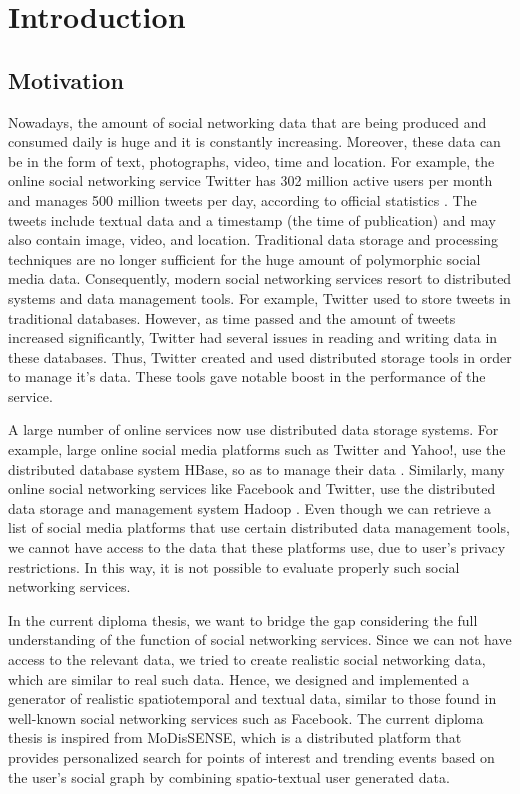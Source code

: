 \setcounter{chapter}{0}

\chapter{Introduction}

\setcounter{chapter}{1}

\section{Motivation}

Nowadays, the amount of social networking data that are being produced and consumed daily is huge and it is constantly increasing.
Moreover, these data can be in the form of text, photographs, video, time and location. For example, the online social networking service Twitter 
has 302 million active users per month and manages 500 million tweets per day, according to official statistics \cite {1}. 
The tweets include textual data and a timestamp (the time of publication) and may also contain
image, video, and location. Traditional data storage and processing techniques are no longer sufficient for the huge amount of polymorphic 
social media data. Consequently, modern social networking services
resort to distributed systems and data management tools. For example, Twitter \cite {2} used to 
store tweets in traditional databases. However, as time passed and the amount of tweets increased significantly, Twitter had several issues in 
reading and writing data in these databases. Thus, Twitter created and used distributed storage tools in order to manage it's data. 
These tools gave notable boost in the performance of the service.

A large number of online services now use distributed data storage systems. For example, large online social media platforms 
such as Twitter and Yahoo!, use the distributed database system HBase, so as to manage their data \cite {4}. 
Similarly, many online social networking services like Facebook and Twitter,
use the distributed data storage and management system Hadoop \cite {6}. 
Even though we can retrieve a list of social media platforms that use certain distributed data management tools, 
we cannot have access to the data that these platforms use, due to user's privacy restrictions. 
In this way, it is not possible to 
evaluate properly such social networking services.

In the current diploma thesis, we want to bridge the gap considering the full understanding of the function of social networking services.
Since we can not have access to the relevant data, we tried to create realistic social networking data, which are similar to real such data.
Hence, we designed and implemented a generator of realistic spatiotemporal and textual data, similar to 
those found in well-known social networking services such as Facebook. The current diploma thesis is inspired from MoDisSENSE, which is a 
distributed platform that provides personalized search for points of interest and trending events based on the user’s social graph by combining spatio-textual 
user generated data.\cite{29}

